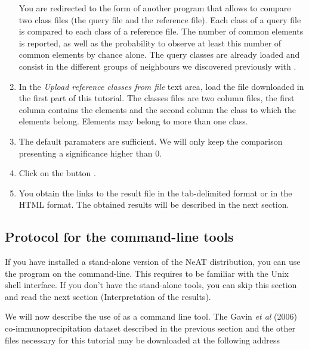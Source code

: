 \begin{enumerate}
  You are redirected to the form of another program
   that allows to compare two class files
  (the query file and the reference file). Each class of a query file
  is compared to each class of a reference file. The number of common
  elements is reported, as well as the probability to observe at least
  this number of common elements by chance alone. The query classes
  are already loaded and consist in the different groups of neighbours
  we discovered previously with .

\item In the \textit{Upload reference classes from file} text area,
  load the file  downloaded
  in the first part of this tutorial. The classes files are two column
  files, the first column contains the elements and the second column
  the class to which the elements belong. Elements may belong to more
  than one class.

\item The default paramaters are sufficient. We will only keep the
  comparison presenting a significance higher than 0.

\item Click on the button .

\item You obtain the links to the result file in the tab-delimited
  format or in the HTML format. The obtained results will be described
  in the next section.

\end{enumerate}


\subsection{Protocol for the command-line tools}

If you have installed a stand-alone version of the NeAT distribution,
you can use the program  on the
command-line. This requires to be familiar with the Unix shell
interface. If you don't have the stand-alone tools, you can skip this
section and read the next section (Interpretation of the results).

We will now describe the use of  as a
command line tool.  The Gavin \textit{et al} (2006) \cite{Gavin2006}
co-immunoprecipitation dataset described in the previous section and
the other files necessary for this tutorial may be downloaded at the
following address

